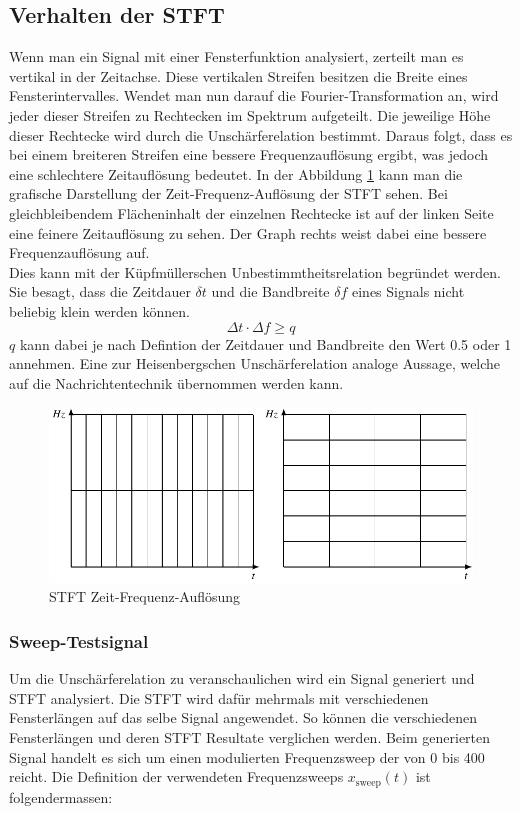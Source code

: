 \subsection{Verhalten der STFT}

Wenn man ein Signal mit einer Fensterfunktion analysiert, zerteilt man es vertikal in der Zeitachse. Diese vertikalen Streifen besitzen die Breite eines Fensterintervalles. Wendet man nun darauf die Fourier-Transformation an, wird jeder dieser Streifen zu Rechtecken im Spektrum aufgeteilt. Die jeweilige Höhe dieser Rechtecke wird durch die Unschärferelation bestimmt. Daraus folgt, dass es bei einem breiteren Streifen eine bessere Frequenzauflösung ergibt, was jedoch eine schlechtere Zeitauflösung bedeutet. In der Abbildung \ref{fig:stftauf} kann man die grafische Darstellung der Zeit-Frequenz-Auflösung der STFT sehen. Bei gleichbleibendem Flächeninhalt der einzelnen Rechtecke ist auf der linken Seite eine feinere Zeitauflösung zu sehen. Der Graph rechts weist dabei eine bessere Frequenzauflösung auf. \\

Dies kann mit der Küpfmüllerschen Unbestimmtheitsrelation begründet werden. Sie besagt, dass die Zeitdauer $\delta t$ und die Bandbreite $\delta f$ eines Signals nicht beliebig klein werden können.  
\[\Delta t \cdot \Delta f \geq q\]
$q$ kann dabei je nach Defintion der Zeitdauer und Bandbreite den Wert 0.5 oder 1 annehmen. Eine zur Heisenbergschen Unschärferelation analoge Aussage, welche auf die Nachrichtentechnik übernommen werden kann.


\begin{figure}[!ht]
	\centering
	\includegraphics[width=0.9\linewidth]{papers/autotune/sections/fft/images/windows.pdf}
	\caption{STFT Zeit-Frequenz-Auflösung}\label{fig:stftauf}	
\end{figure}



\subsubsection{Sweep-Testsignal}
Um die Unschärferelation zu veranschaulichen wird ein Signal generiert und STFT analysiert. Die STFT wird dafür mehrmals mit verschiedenen Fensterlängen auf das selbe Signal angewendet. So können die verschiedenen Fensterlängen und deren STFT Resultate verglichen werden. Beim generierten Signal handelt es sich um einen modulierten Frequenzsweep der von 0 bis 400\text{[Hz]} reicht. Die Definition der verwendeten Frequenzsweeps $x_{\text{sweep}}(t)$ ist folgendermassen:

